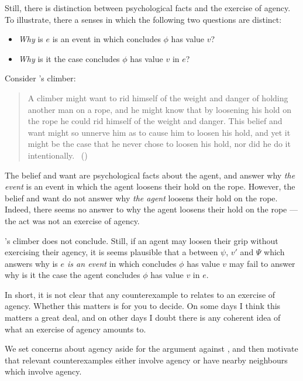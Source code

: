 \begin{note}
  Still, there is distinction between psychological facts and the exercise of agency.
  To illustrate, there a senses in which the following two questions are distinct:

  \begin{itemize}
  \item
    \emph{Why} is \(e\) is an event in which \vAgent{} concludes \(\phi\) has value \(v\)?
  \item
    \emph{Why} is it the case \vAgent{} concludes \(\phi\) has value \(v\) in \(e\)?
  \end{itemize}
  Consider \citeauthor{Davidson:1973vd}'s climber:
  \begin{quote}
    A climber might want to rid himself of the weight and danger of holding another man on a rope, and he might know that by loosening his hold on the rope he could rid himself of the weight and danger.
    This belief and want might so unnerve him as to cause him to loosen his hold, and yet it might be the case that he never chose to loosen his hold, nor did he do it intentionally.%
    \mbox{ }\hfill\mbox{(\citeyear[79]{Davidson:1973vd})}
  \end{quote}
  The \agents{} belief and want are psychological facts about the agent, and answer why \emph{the event} is an event in which the agent loosens their hold on the rope.
  However, the \agents{} belief and want do not answer why \emph{the agent} loosens their hold on the rope.
  Indeed, there seems no answer to why the agent loosens their hold on the rope --- the act was not an exercise of agency.

  \citeauthor{Davidson:1973vd}'s climber does not conclude.
  Still, if an agent may loosen their grip without exercising their agency, it is seems plausible that a \ros{} between \(\psi\), \(v'\) and \(\Psi\) which answers why is \emph{\(e\) is an event} in which \vAgent{} concludes \(\phi\) has value \(v\) may fail to answer why is it the case the agent concludes \(\phi\) has value \(v\) in \(e\).

  In short, it is not clear that any counterexample to \issueInclusion{} relates to an exercise of agency.
  Whether this matters is for you to decide.
  On some days I think this matters a great deal, and on other days I doubt there is any coherent idea of what an exercise of agency amounts to.

  We set concerns about agency aside for the argument against \issueInclusion{}, and then motivate that relevant counterexamples either involve agency or have nearby neighbours which involve agency.
\end{note}


